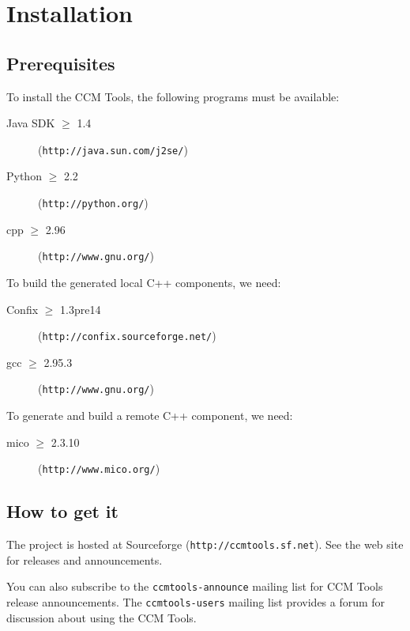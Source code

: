 \chapter{Installation}

\section{Prerequisites}

To install the CCM Tools, the following programs must be available:
\begin{description}
\item [Java SDK $\ge$ 1.4] ({\tt http://java.sun.com/j2se/})
\item [Python $\ge$ 2.2] ({\tt http://python.org/})
\item [cpp $\ge$ 2.96] ({\tt http://www.gnu.org/})
\end{description}

To build the generated local C++ components, we need:
\begin{description}
\item [Confix $\ge$ 1.3pre14] ({\tt http://confix.sourceforge.net/})
\item [gcc $\ge$ 2.95.3] ({\tt http://www.gnu.org/})
\end{description}

To generate and build a remote C++ component, we need:
\begin{description}
\item [mico $\ge$ 2.3.10] ({\tt http://www.mico.org/})
\end{description}


\section{How to get it}

The project is hosted at Sourceforge ({\tt http://ccmtools.sf.net}). See the web
site for releases and announcements.

You can also subscribe to the {\tt ccmtools-announce} mailing list for CCM Tools
release announcements. The {\tt ccmtools-users} mailing list provides a forum
for discussion about using the CCM Tools.

